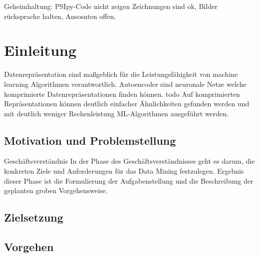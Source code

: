 \listoftodos

Geheimhaltung: PSIpy-Code nicht zeigen Zeichnungen sind ok, Bilder rücksprache halten, Ansosnten offen.
 
\chapter{Einleitung}
\label{chap:Einleitung}
	Datenrepräsentation sind maßgeblich für die Leistungsfähigkeit von machine learning Algorithmen verantwortlich. Autoencoder sind neuronale Netze welche komprimierte Datenrepräsentationen finden können. todo Auf komprimierten Repräsentationen können deutlich einfacher Ähnlichkeiten gefunden werden  und mit deutlich weniger Rechenleistung ML-Algorithmen ausgeführt werden.
  

	\section{Motivation und Problemstellung}
	\label{sec:MotivationUndProblemstellung}

	Geschäftsverständnis
	In der Phase des Geschäftsverständnisses geht es darum, die konkreten Ziele und Anforderungen für das Data Mining festzulegen. Ergebnis dieser Phase ist die Formulierung der Aufgabenstellung und die Beschreibung der geplanten groben Vorgehensweise.
	

	\section{Zielsetzung}
	\label{sec:Zielsetzung}

	\section{Vorgehen}
	\label{sec:Vorgehen}



